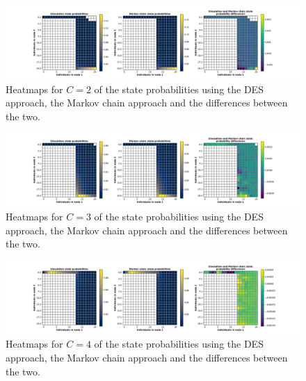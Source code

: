 \begin{figure}[H]
    \includegraphics[width=\textwidth, trim=100 10 100 10, clip]{chapters/03_queueing_model/img/numeric_results_and_timings/steady_state_probabilities_2/main_2.pdf}
    \caption{Heatmaps for \(C = 2\) of the state probabilities using the
    DES approach, the Markov chain approach and the differences between the
    two.}
    \label{fig:comparison_steady_state_probabilities_2_2}
\end{figure}

\begin{figure}[H]
    \includegraphics[width=\textwidth, trim=100 10 100 10, clip]{chapters/03_queueing_model/img/numeric_results_and_timings/steady_state_probabilities_2/main_3.pdf}
    \caption{Heatmaps for \(C = 3\) of the state probabilities using the
    DES approach, the Markov chain approach and the differences between the
    two.}
    \label{fig:comparison_steady_state_probabilities_2_3}
\end{figure}

\begin{figure}[H]
    \includegraphics[width=\textwidth, trim=100 10 100 10, clip]{chapters/03_queueing_model/img/numeric_results_and_timings/steady_state_probabilities_2/main_4.pdf}
    \caption{Heatmaps for \(C = 4\) of the state probabilities using the
    DES approach, the Markov chain approach and the differences between the
    two.}
    \label{fig:comparison_steady_state_probabilities_2_4}
\end{figure}

